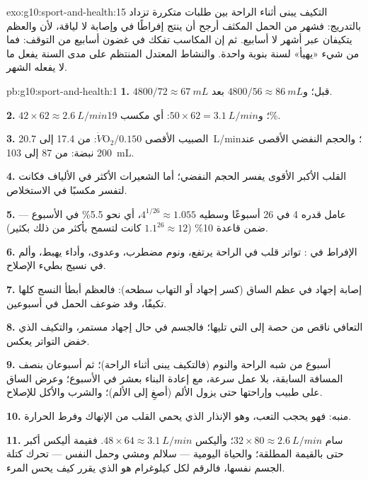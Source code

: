\begin{solution}{exo:g10:sport-and-health:15}
التكيف يبنى أثناء الراحة بين طلبات متكررة تزداد بالتدريج: فشهر من
الحمل المكثف أرجح أن ينتج إفراطًا في  وإصابة لا لياقة، لأن
 والعظم يتكيفان عبر أشهر لا أسابيع. ثم إن المكاسب تفكك في غضون
أسابيع من التوقف: فما من شيء «يهيأ» لسنة بنوبة واحدة. والنشاط المعتدل
المنتظم على مدى السنة يفعل ما لا يفعله الشهر.
\end{solution}

\begin{solution}{pb:g10:sport-and-health:1}
\textbf{1.} $4800/72 \approx \qty{67}{mL}$ قبل؛ و$4800/56 \approx
\qty{86}{mL}$ بعد.

\textbf{2.} $42 \times 62 \approx \qty{2.6}{L/min}$؛ و$50 \times 62 =
\qty{3.1}{L/min}$: أي مكسب 19\%.

\textbf{3.} الصبيب الأقصى $\dot V\!\mathrm{O_2}/0.150$: من
\num{17.4} إلى \qty{20.7}{L/min}؛ والحجم النفضي الأقصى عند 200 نبضة:
من \num{87} إلى \qty{103}{mL}.

\textbf{4.} القلب الأكبر الأقوى يفسر الحجم النفضي؛ أما الشعيرات
 الأكثر في الألياف فكانت لتفسر مكسبًا في الاستخلاص.

\textbf{5.} عامل قدره 4 في 26 أسبوعًا وسطيه $4^{1/26}
\approx 1.055$، أي نحو 5.5\% في الأسبوع --- ضمن قاعدة 10\% ($1.1^{26}
\approx 12$ كانت لتسمح بأكثر من ذلك بكثير).

\textbf{6.} الإفراط في : تواتر قلب في الراحة يرتفع، ونوم
مضطرب، وعدوى، وأداء يهبط، وألم في نسيج بطيء الإصلاح.

\textbf{7.} إصابة إجهاد في عظم الساق (كسر إجهاد أو التهاب سطحه):
فالعظم أبطأ النسج كلها تكيفًا، وقد ضوعف الحمل في أسبوعين.

\textbf{8.} التعافي ناقص من حصة إلى التي تليها؛ فالجسم في حال إجهاد
مستمر، والتكيف الذي خفض التواتر يعكس.

\textbf{9.} أسبوع من شبه الراحة والنوم (فالتكيف يبنى أثناء الراحة)؛
ثم أسبوعان بنصف المسافة السابقة، بلا عمل سرعة، مع إعادة البناء بعشر
في الأسبوع؛ وعرض الساق على طبيب وإراحتها حتى يزول الألم (أصغِ إلى
الألم)؛ والشرب والأكل للإصلاح.

\textbf{10.} منبه: فهو يحجب التعب، وهو الإنذار الذي يحمي القلب من
الإنهاك وفرط الحرارة.

\textbf{11.} سام $32 \times 80 \approx \qty{2.6}{L/min}$؛ وأليكس $48
\times 64 \approx \qty{3.1}{L/min}$. فقيمة أليكس أكبر حتى بالقيمة
المطلقة؛ والحياة اليومية --- سلالم ومشي وحمل النفس --- تحرك كتلة
الجسم نفسها، فالرقم لكل كيلوغرام هو الذي يقرر كيف يحس المرء.


\end{solution}
